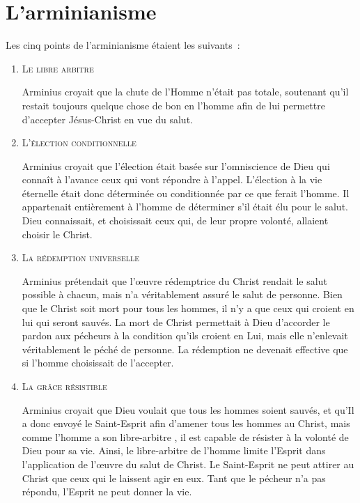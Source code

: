 \section{L'arminianisme}

Les \og cinq points de l'arminianisme \fg{} étaient les suivants~:

\begin{enumerate}
  \item  \textsc{Le libre arbitre}

Arminius croyait que la chute de l'Homme n'était pas totale,
 soutenant qu'il restait toujours quelque chose de bon en l'homme
 afin de lui permettre d'accepter Jésus-Christ en vue du salut.

  \item  \textsc{L'élection conditionnelle}

Arminius croyait que l'élection était basée sur l'omniscience de Dieu
 qui connaît à l'avance ceux qui vont répondre à l'appel.
 L'élection à la vie éternelle était donc déterminée ou conditionnée
 par ce que ferait l'homme. Il appartenait entièrement à l'homme
 de déterminer s'il était élu pour le salut.
 Dieu connaissait, et choisissait ceux qui,
 de leur propre volonté, allaient choisir le Christ.

  \item  \textsc{La rédemption universelle}

Arminius prétendait que l'œuvre rédemptrice du Christ rendait le salut possible
 à chacun, mais n'a véritablement assuré le salut de personne.
 Bien que le Christ soit mort pour tous les hommes,
 il n'y a que ceux qui croient en lui qui seront sauvés.
 La mort de Christ permettait à Dieu d'accorder le pardon aux pécheurs
 à la condition qu'ils croient en Lui, mais elle n'enlevait véritablement
 le péché de personne. La rédemption ne devenait effective
 que si l'homme choisissait de l'accepter.

  \item  \textsc{La grâce résistible}

Arminius croyait que Dieu voulait que tous les hommes soient sauvés,
 et  qu'Il a donc envoyé le Saint-Esprit afin d'\og amener \fg{} tous les hommes au Christ,
 mais comme l'homme  a son \og libre-arbitre \fg{}, il est capable de résister
 à la volonté de Dieu pour sa vie. Ainsi, le libre-arbitre de l'homme
 limite l'Esprit dans l'application de l'œuvre du salut de Christ.
 Le Saint-Esprit ne peut attirer au Christ que ceux qui le laissent agir en eux.
 Tant que le pécheur n'a pas répondu, l'Esprit ne peut donner la vie.


\end{enumerate}
